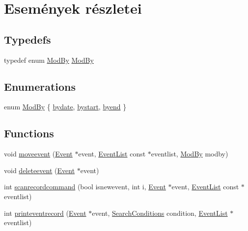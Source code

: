 \hypertarget{group__eventrecord}{}\section{Események részletei}
\label{group__eventrecord}
\subsection*{Typedefs}
\begin{DoxyCompactItemize}
\item 
typedef enum \hyperlink{group__eventrecord_ga643f8b09cbc45afc4ad36b27c077b1fd}{Mod\+By} \hyperlink{group__eventrecord_ga362ee478a7a01737cf42d32360eda02e}{Mod\+By}
\end{DoxyCompactItemize}
\subsection*{Enumerations}
\begin{DoxyCompactItemize}
\item 
enum \hyperlink{group__eventrecord_ga643f8b09cbc45afc4ad36b27c077b1fd}{Mod\+By} \{ \hyperlink{group__eventrecord_gga643f8b09cbc45afc4ad36b27c077b1fdaa9de7918fcb113fa90f19d4b2d4d9145}{bydate}, 
\hyperlink{group__eventrecord_gga643f8b09cbc45afc4ad36b27c077b1fdafdfbfec88cf0d73c65e444460a06ea52}{bystart}, 
\hyperlink{group__eventrecord_gga643f8b09cbc45afc4ad36b27c077b1fdabf00156964562a454e20d189035c3cb3}{byend}
 \}
\end{DoxyCompactItemize}
\subsection*{Functions}
\begin{DoxyCompactItemize}
\item 
void \hyperlink{group__eventrecord_ga610dc34a1e251a16311ca7ac15f64e05}{moveevent} (\hyperlink{struct_event}{Event} $\ast$event, \hyperlink{struct_event_list}{Event\+List} const $\ast$eventlist, \hyperlink{group__eventrecord_ga643f8b09cbc45afc4ad36b27c077b1fd}{Mod\+By} modby)
\item 
void \hyperlink{group__eventrecord_gaf69a5ee77b139263897d5e6bfe7d7f2a}{deleteevent} (\hyperlink{struct_event}{Event} $\ast$event)
\item 
int \hyperlink{group__eventrecord_gac6e06e3186496cd8eb6618baf3ca9d3e}{scanrecordcommand} (bool isnewevent, int i, \hyperlink{struct_event}{Event} $\ast$event, \hyperlink{struct_event_list}{Event\+List} const $\ast$eventlist)
\item 
int \hyperlink{group__eventrecord_ga43a7dc247171d596d8d808776d8d40f5}{printeventrecord} (\hyperlink{struct_event}{Event} $\ast$event, \hyperlink{struct_search_conditions}{Search\+Conditions} condition, \hyperlink{struct_event_list}{Event\+List} $\ast$eventlist)
\end{DoxyCompactItemize}



